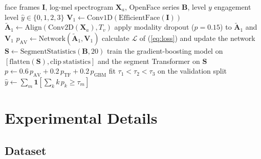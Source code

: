 \documentclass[journal]{IEEEtran}
\newcommand{\ournet}{AVB-Engage}
\begin{document}
\begin{algorithm}[!t]
\caption{\ournet{} Training and Inference}
\label{alg:ournet}
\begin{algorithmic}[1]
\REQUIRE face frames $\mathbf{I}$, log-mel spectrogram $\mathbf{X}_a$, OpenFace series $\mathbf{B}$, level $y$
\ENSURE engagement level $\hat{y} \in \{0,1,2,3\}$
\STATE $\mathbf{V}_1 \leftarrow \mathrm{Conv1D}(\mathrm{EfficientFace}(\mathbf{I}))$
\STATE $\tilde{\mathbf{A}}_1 \leftarrow \mathrm{Align}(\mathrm{Conv2D}(\mathbf{X}_a), T_v)$
\STATE apply modality dropout ($p = 0.15$) to $\tilde{\mathbf{A}}_1$ and $\mathbf{V}_1$
\STATE $p_{\mathrm{AV}} \leftarrow \mathrm{Network}(\tilde{\mathbf{A}}_1, \mathbf{V}_1)$ 
\STATE calculate $\mathcal{L}$ of (\ref{eq:loss}) and update the network
\ENDFOR
\STATE $\mathbf{S} \leftarrow \mathrm{SegmentStatistics}(\mathbf{B}, 20)$
\STATE train the gradient-boosting model on $[\mathrm{flatten}(\mathbf{S}), \mathrm{clip\ statistics}]$ and the segment Transformer on $\mathbf{S}$
\STATE $p \leftarrow 0.6\,p_{\mathrm{AV}} + 0.2\,p_{\mathrm{TF}} + 0.2\,p_{\mathrm{GBM}}$
\STATE fit $\tau_1 < \tau_2 < \tau_3$ on the validation split
\STATE $\hat{y} \leftarrow \sum_{m} \mathbf{1}[\sum_k k\,p_k \ge \tau_m]$
\end{algorithmic}
\end{algorithm}

\section{Experimental Details}
\label{sec:exp}

\subsection{Dataset}
\label{sec:dataset}
\end{document}
